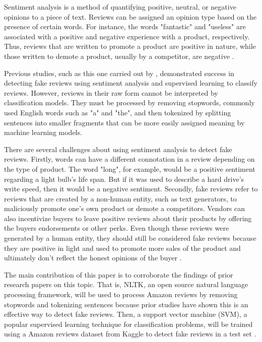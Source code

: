\documentclass[12pt]{article}
\begin{document}
Sentiment analysis is a method of quantifying positive, neutral, or negative opinions to a piece of text. Reviews can be assigned an opinion type based on the presence of certain words. For instance, the words "fantastic" and "useless" are associated with a positive and negative experience with a product, respectively. Thus, reviews that are written to promote a product are positive in nature, while those written to demote a product, usually by a competitor, are negative \citep{pendyala_2019}.

Previous studies, such as this one carried out by \citep{article}, demonstrated success in detecting fake reviews using sentiment analysis and supervised learning to classify reviews. However, reviews in their raw form cannot be interpreted by classification models. They must be processed by removing stopwords, commonly used English words such as "a" and "the", and then tokenized by splitting sentences into smaller fragments that can be more easily assigned meaning by machine learning models. 

There are several challenges about using sentiment analysis to detect fake reviews. Firstly, words can have a different connotation in a review depending on the type of product. The word "long", for example, would be a positive sentiment regarding a light bulb's life span. But if it was used to describe a hard drive's write speed, then it would be a negative sentiment. Secondly, fake reviews refer to reviews that are created by a non-human entity, such as text generators, to maliciously promote one's own product or demote a competitors. Vendors can also incentivize buyers to leave positive reviews about their products by offering the buyers endorsements or other perks. Even though these reviews were generated by a human entity, they should still be considered fake reviews because they are positive in light and used to promote more sales of the product and ultimately don't reflect the honest opinions of the buyer \citep{Salminen2022}.

The main contribution of this paper is to corroborate the findings of prior research papers on this topic. That is, NLTK, an open source natural language processing framework, will be used to process Amazon reviews by removing stopwords and tokenizing sentences because prior studies have shown this is an effective way to detect fake reviews. Then, a support vector machine (SVM), a popular supervised learning technique for classification problems, will be trained using a Amazon reviews dataset from Kaggle to detect fake reviews in a test set \citep{kr.goyal_keswani_goyal}.
\end{document}
